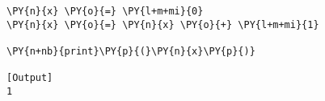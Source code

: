 \begin{Verbatim}[label=\makebox{\href{https://github.com/unipi-physics-labs/statnotes/tree/main/snippy/assignment.py}{https://github.com/.../assignment.py}},commandchars=\\\{\}]
\PY{n}{x} \PY{o}{=} \PY{l+m+mi}{0}
\PY{n}{x} \PY{o}{=} \PY{n}{x} \PY{o}{+} \PY{l+m+mi}{1}

\PY{n+nb}{print}\PY{p}{(}\PY{n}{x}\PY{p}{)}

[Output]
1
\end{Verbatim}
